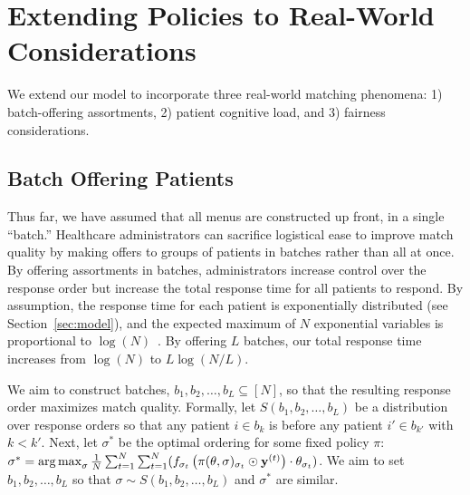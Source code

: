 \section{Extending Policies to Real-World Considerations}
\label{sec:real_world}
We extend our model to incorporate three real-world matching phenomena: 1) batch-offering assortments, 2) patient cognitive load, and 3) fairness considerations. 

\subsection{Batch Offering Patients}
\label{sec:batching}
Thus far, we have assumed that all menus are constructed up front, in a single ``batch.'' Healthcare administrators can sacrifice logistical ease to improve match quality by making offers to groups of patients in batches rather than all at once.
By offering assortments in batches, administrators increase control over the response order but increase the total response time for all patients to respond. 
By assumption, the response time for each patient is exponentially distributed (see Section~\ref{sec:model}), and the expected maximum of $N$ exponential variables is proportional to $\log(N)$~\citep{max_exponential}.
By offering $L$ batches, our total response time increases from $\log(N)$ to $L \log(N/L)$. 

We aim to construct batches, $b_{1},b_{2},\ldots,b_{L} \subseteq [N]$, so that the resulting response order maximizes match quality. 
Formally, let $S(b_{1},b_{2},\ldots,b_{L})$ be a distribution over response orders so that any patient $i \in b_{k}$ is before any patient $i' \in b_{k'}$ with $k < k'$. 
Next, let $\sigma^{*}$ be the optimal ordering for some fixed policy $\pi$: $\sigma^{*} = \operatorname*{arg\,max}_{\sigma} \frac{1}{N} \sum_{t=1}^{N} \sum_{t=1}^{N}  (f_{\sigma_{t}}\left(\pi(\theta,\sigma)_{\sigma_{t}} \odot \mathbf{y}^{(t)}\right) \cdot \theta_{\sigma_{t}})
$. 
We aim to set $b_{1},b_{2},\ldots,b_{L}$ so that $\sigma \sim S(b_{1},b_{2},\ldots,b_{L})$ and $\sigma^{*}$ are similar. 

